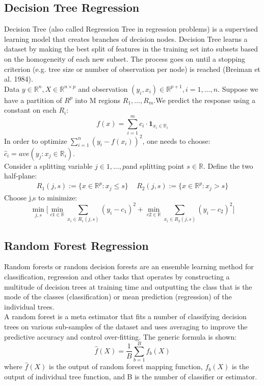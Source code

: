 \documentclass[12pt,a4paper]{report}
\begin{document}
\subsection{Decision Tree Regression}
Decision Tree \cite{Dom} (also called Regression Tree in regression problems) is a supervised learning model that creates branches of decision nodes. Decision Tree learns a dataset by making the best split of features in the training set into subsets based on the homogeneity of each new subset. The process goes on until a stopping criterion (e.g. tree size or number of observation per node) is reached (Breiman et al. 1984).\\
Data $y \in \mathbb{R}^{n}, X \in \mathbb{R}^{n\times p}$ and observation $(y_{i},x_{i}) \in \mathbb{R}^{p+1}, i = 1,\ldots,n.$
Suppose we have a partition of $R^{p}$ into M regions $R_{1}, \ldots, R_{m}$.We predict the response using a constant on each $R_{i}$:
\begin{equation}
f(x) = \sum_{i=1}^{m}c_{i}\cdot \textbf{1}_{x_{i} \in \mathbb{R}_{i}}
\end{equation}
In order to optimize $\sum_{i=1}^{n}(y_{i} - f(x_{i}))^2$, one needs to choose: $\hat{c}_{i} = ave(y_{j}: x_{j} \in \mathbb{R}_{i})$.\\
Consider a splitting variable $j \in {1, \ldots, p} $and splitting point $s \in \mathbb{R}$. Define the two half-plane:
\begin{align*}
R_{1}(j,s) := \{x \in \mathbb{R}^{p}: x_{j} \leq s\} \, \, \, \, \, \, \,
R_{2}(j,s) := \{x \in \mathbb{R}^{p}: x_{j} > s\}
\end{align*}
Choose j,s to minimize:
\begin{equation}
\min_{j,s} \Bigg[\min_{c1 \in \mathbb{R}} \sum_{x_{i} \in R_{1}(j,s)} (y_{i} - c_{1})^2 + \min_{c2 \in \mathbb{R}} \sum_{x_{i} \in R_{2}(j,s)} (y_{i} - c_{2})^2\Bigg]
\end{equation}

\subsection{Random Forest Regression}
Random forests or random decision forests are an ensemble learning method for classification, regression and other tasks that operates by constructing a multitude of decision trees at training time and outputting the class that is the mode of the classes (classification) or mean prediction (regression) of the individual trees\cite{Ho}.\\
A random forest is a meta estimator that fits a number of classifying decision trees on various sub-samples of the dataset and uses averaging to improve the predictive accuracy and control over-fitting. The generic formula is shown:
\begin{equation}
\hat{f}(X) = \frac{1}{B} \sum_{b=1}^{B} f_{b}(X)
\end{equation}
where $\hat{f}(X)$ is the output of random forest mapping function, $f_{b}(X)$ is the output of individual tree function, and B is the number of classifier or estimator.\cite{Hastie}
\end{document}
